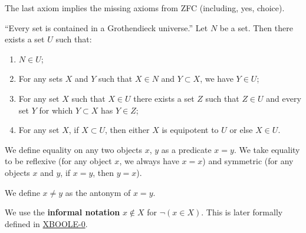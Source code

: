 \noindent The last axiom implies the missing axioms from ZFC (including, yes, choice).

\begin{axiom}[Universe]
``Every set is contained in a Grothendieck universe.''
  Let $N$ be a set. Then there exists a set $U$ such that:
  \begin{enumerate}
  \item $N\in U$;
  \item For any sets $X$ and $Y$ such that $X\in N$ and $Y\subset X$,
    we have $Y\in U$;
  \item For any set $X$ such that $X\in U$ there exists a set $Z$ such that $Z\in U$ and
    every set $Y$ for which $Y\subset X$ has $Y\in Z$;
  \item For any set $X$, if $X\subset U$, then either $X$ is equipotent
    to $U$ or else $X\in U$.
  \end{enumerate}
\end{axiom}

\begin{definition}
  We define equality on any two objects $x$, $y$ as a predicate $x=y$.
  We take equality to be reflexive (for any object $x$, we always have $x=x$)
and symmetric (for any objects $x$ and $y$, if $x=y$, then $y=x$).

We define $x\neq y$ as the antonym of $x=y$.
\end{definition}

\begin{notation}
We use the \textbf{informal notation} $x\notin X$ for $\neg(x\in X)$. This is
later formally defined in \hyperlink{notation:xboole0:nin}{XBOOLE-0}.
\end{notation}
